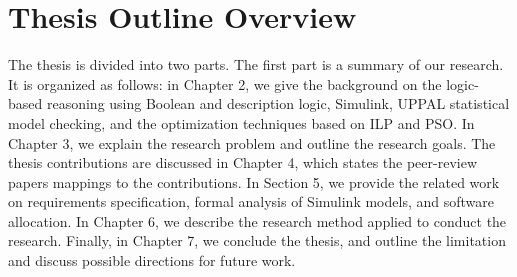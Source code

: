 
\section{Thesis Outline Overview}
The thesis is divided into two parts. The first part is a summary of our research. It is organized as follows: in Chapter 2, we give the background on the logic-based reasoning using Boolean and description logic, Simulink, UPPAL statistical model checking, and the optimization techniques based on ILP and PSO. In Chapter 3, we explain the research problem and outline the research goals. The thesis contributions are discussed in Chapter 4, which states the peer-review papers mappings to the contributions. In Section 5, we provide the related work on requirements specification, formal analysis of Simulink models, and software allocation. In Chapter 6, we describe the research method applied to conduct the research. Finally, in Chapter 7, we conclude the thesis, and outline the limitation and discuss possible directions for future work.

